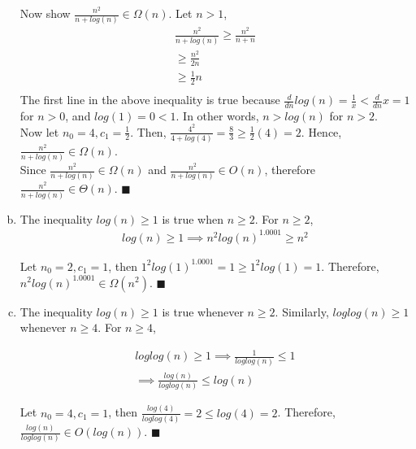 \documentclass[12pt]{article}
\begin{document}
\begin{enumerate}[a.]
{Now show  $\frac{n^2}{n+log(n)} \in \Omega(n)$. Let $n > 1$,
\begin{gather*}
\frac{n^2}{n+log(n)} \ge \frac{n^2}{n+n}\\
\ge \frac{n^2}{2n}\\
\ge \frac{1}{2}n\\
\end{gather*}
The first line in the above inequality is true because $\frac{d}{dn}log(n) = \frac{1}{x} < \frac{d}{dn}x = 1$ for $n>0$, and $log(1) = 0 < 1$. In other words, $n > log(n)$ for $n>2$.\\

Now let $n_0 = 4, c_1 = \frac{1}{2}$. Then, $\frac{4^2}{4+log(4)} = \frac{8}{3} \ge \frac{1}{2}(4) = 2$. Hence, $\frac{n^2}{n+log(n)} \in \Omega(n)$.\\

Since $\frac{n^2}{n+log(n)} \in \Omega(n)$ and $\frac{n^2}{n+log(n)} \in O(n)$, therefore $\frac{n^2}{n+log(n)} \in \Theta(n)$. \hfill $\blacksquare$
}

\item
{\bf

The inequality $log(n) \ge 1$ is true when $n \ge 2$. For $n \ge 2$,
\begin{gather*}
log(n) \ge 1 \implies n^2log(n)^{1.0001} \ge n^2
\end{gather*}

Let $n_0 = 2, c_1 = 1$, then $1^2log(1)^{1.0001} = 1 \ge 1^2log(1) = 1$. Therefore, $n^2log(n)^{1.0001} \in \Omega(n^2)$. \hfill $\blacksquare$
}

\item
{\bf

The inequality $log(n) \ge 1$ is true whenever $n \ge 2$. Similarly, $loglog(n) \ge 1$ whenever $n \ge 4$. For $n \ge 4$,

\begin{gather*}
loglog(n) \ge 1 \implies \frac{1}{loglog(n)} \le 1\\
\implies \frac{log(n)}{loglog(n)} \le log(n)
\end{gather*}

Let $n_0 = 4, c_1 = 1$, then $\frac{log(4)}{loglog(4)} = 2 \le log(4) = 2$. Therefore, $\frac{log(n)}{loglog(n)} \in O(log(n))$. \hfill $\blacksquare$
}

\end{enumerate}
\end{document}
